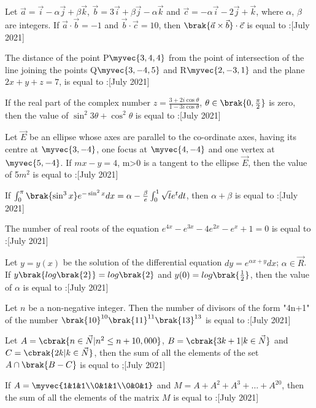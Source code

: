 \iffalse
\title{2021}
\author{EE24BTECH11012}
\section{integer}
\fi
	\item Let $\vec{a} = \vec{i} - \alpha\vec{j} + \beta\vec{k}$, $\vec{b} = 3\vec{i} + \beta\vec{j} - \alpha\vec{k}$ and $\vec{c} = -\alpha\vec{i} - 2\vec{j} + \vec{k}$, where $\alpha$, $\beta$ are integers. If $\vec{a} \cdot \vec{b} = -1$ and $\vec{b} \cdot \vec{c} = 10$, then $\brak{\vec{a} \times \vec{b}} \cdot \vec{c}$ is equal to :\hfill{[July 2021]}
	\item The distance of the point P$\myvec{3,4,4}$ from the point of intersection of the line joining the points Q$\myvec{3,-4,5}$ and R$\myvec{2,-3,1}$ and the plane $2x+y+z=7$, is equal to :\hfill{[July 2021]}
	\item If the real part of the complex number $ z = \frac{3+2i\cos{\theta}}{1-3i\cos{\theta}}$, $\theta \in \brak{0, \frac{\pi}{2}}$ is zero, then the value of $\sin^{2}{3\theta} + \cos^{2}{\theta}$ is equal to :\hfill{[July 2021]}
	\item Let $\vec{E}$ be an ellipse whose axes are parallel to the co-ordinate axes, having its centre at $\myvec{3,-4}$, one focus at $\myvec{4,-4}$ and one vertex at $\myvec{5,-4}$. If $mx - y = 4$, m>0 is a tangent to the ellipse $\vec{E}$, then the value of 5$m^2$ is equal to :\hfill{[July 2021]}
	\item If $\int_{0}^{\pi} \brak{\sin^{3}{x}}e^{-\sin^{2}{x}} dx = \alpha - \frac{\beta}{e} \int_{0}^{1} \sqrt{t}e^{t} dt$, then $\alpha + \beta$ is equal to :\hfill{[July 2021]}
	\item The number of real roots of the equation $ e^{4x} - e^{3x} - 4e^{2x} - e^{x} + 1 = 0$ is equal to :\hfill{[July 2021]}
	\item Let $ y = y(x) $ be the solution of the differential equation $ dy = e^{\alpha x + y} dx $; $\alpha \in \vec{R}$. If $ y\brak{log\brak{2}} = log\brak{2}$ and $y(0) = log\brak{\frac{1}{2}}$, then the value of $\alpha$ is equal to :\hfill{[July 2021]}
	\item Let $n$ be a non-negative integer. Then the number of divisors of the form "4n+1" of the number $\brak{10}^{10}\brak{11}^{11}\brak{13}^{13}$ is equal to :\hfill{[July 2021]}
	\item Let $A = \cbrak{n \in \vec{N} | n^2 \leq n + 10,000}$, $B = \cbrak{3k+1 | k \in \vec{N}}$ and $C = \cbrak{2k | k \in \vec{N}}$, then the sum of all the elements of the set $ A \cap \brak{ B-C}$ is equal to ;\hfill{[July 2021]}
	\item If $A = \myvec{1&1&1\\0&1&1\\0&0&1}$ and $M = A + A^2 + A^3 + \dots + A^{20} $, then the sum of all the elements of the matrix $M$ is equal to :\hfill{[July 2021]}
%
